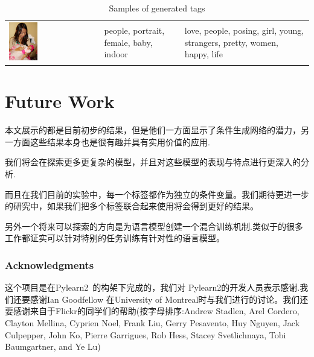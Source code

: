 \documentclass{article} %
\begin{document}
\begin{table}[h]
\begin{tabular} {l | b{3.7cm} | b{3.7cm}}
 \includegraphics[width=0.33\textwidth, height=0.12\textheight]{baby.jpg} & people, portrait, female, baby, indoor & love, people, posing, girl, young, strangers, pretty, women, happy, life \\
\end{tabular}
\label{table:samples}
\caption{Samples of generated tags}
\end{table}

\section{Future Work}
本文展示的都是目前初步的结果，但是他们一方面显示了条件生成网络的潜力，另一方面这些结果本身也是很有趣并具有实用价值的应用.

我们将会在探索更多更复杂的模型，并且对这些模型的表现与特点进行更深入的分析.


而且在我们目前的实验中，每一个标签都作为独立的条件变量。我们期待更进一步的研究中，如果我们把多个标签联合起来使用将会得到更好的结果。

另外一个将来可以探索的方向是为语言模型创建一个混合训练机制.类似于\cite{kiros2013multimodal}的很多工作都证实可以针对特别的任务训练有针对性的语言模型。

\subsubsection*{Acknowledgments}

这个项目是在Pylearn2~\citep{goodfellow2013pylearn2}的构架下完成的，我们对 Pylearn2的开发人员表示感谢.我们还要感谢Ian Goodfellow 在University of Montreal时与我们进行的讨论。我们还要感谢来自于Flickr的同学们的帮助(按字母排序:Andrew Stadlen, Arel Cordero, Clayton Mellina,
Cyprien Noel, Frank Liu, Gerry Pesavento, Huy Nguyen, Jack Culpepper, John Ko, Pierre Garrigues,
Rob Hess, Stacey Svetlichnaya, Tobi Baumgartner, and Ye Lu)

\small{

}
\end{document}
